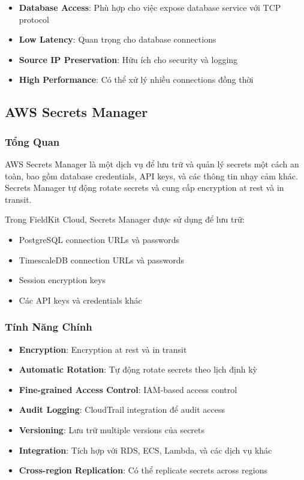 \begin{itemize}
    \item \textbf{Database Access}: Phù hợp cho việc expose database service với TCP protocol
    \item \textbf{Low Latency}: Quan trọng cho database connections
    \item \textbf{Source IP Preservation}: Hữu ích cho security và logging
    \item \textbf{High Performance}: Có thể xử lý nhiều connections đồng thời
\end{itemize}

\subsection{AWS Secrets Manager}

\subsubsection{Tổng Quan}

AWS Secrets Manager là một dịch vụ để lưu trữ và quản lý secrets một cách an toàn, bao gồm database credentials, API keys, và các thông tin nhạy cảm khác. Secrets Manager tự động rotate secrets và cung cấp encryption at rest và in transit.

Trong FieldKit Cloud, Secrets Manager được sử dụng để lưu trữ:
\begin{itemize}
    \item PostgreSQL connection URLs và passwords
    \item TimescaleDB connection URLs và passwords
    \item Session encryption keys
    \item Các API keys và credentials khác
\end{itemize}

\subsubsection{Tính Năng Chính}

\begin{itemize}
    \item \textbf{Encryption}: Encryption at rest và in transit
    \item \textbf{Automatic Rotation}: Tự động rotate secrets theo lịch định kỳ
    \item \textbf{Fine-grained Access Control}: IAM-based access control
    \item \textbf{Audit Logging}: CloudTrail integration để audit access
    \item \textbf{Versioning}: Lưu trữ multiple versions của secrets
    \item \textbf{Integration}: Tích hợp với RDS, ECS, Lambda, và các dịch vụ khác
    \item \textbf{Cross-region Replication}: Có thể replicate secrets across regions
\end{itemize}

